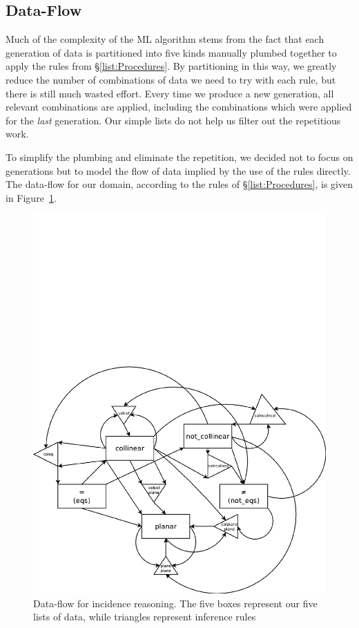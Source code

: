 \subsection{Data-Flow}
Much of the complexity of the ML algorithm stems from the fact that each generation of data is partitioned into five kinds manually plumbed together to apply the rules from \S\ref{list:Procedures}. By partitioning in this way, we greatly reduce the number of combinations of data we need to try with each rule, but there is still much wasted effort. Every time we produce a new generation, all relevant combinations are applied, including the combinations which were applied for the \emph{last} generation. Our simple lists do not help us filter out the repetitious work.

To simplify the plumbing and eliminate the repetition, we decided not to focus on generations but to model the flow of data implied by the use of the rules directly. The data-flow for our domain, according to the rules of \S\ref{list:Procedures}, is given in Figure~\ref{fig:DataFlow}.

\begin{figure}
\centering\includegraphics[scale=0.5]{automation/DataFlow}
\caption{Data-flow for incidence reasoning. The five boxes represent our five lists of data, while triangles represent inference rules}
\label{fig:DataFlow}
\end{figure}

